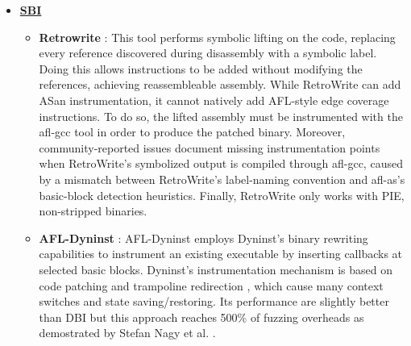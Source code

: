 \begin{itemize}
\begin{itemize}
                    \item \textbf{DynamoRIO/Pin}\cite{DynamoRIOPaper,PinPaper} : Both these approaches share the same base principle, called 
                    \textbf{\gls{JIT} code caching}. This consist on take control of the thread when the target application starts, 
                    and from that moment on every \gls{BB} is intercepted befor it is executed and is copied into a private \textbf{Code Cache}.
                    The instrumentation is then added to the copy and the control is transferred to the code cache.
                    The instrumentation process is more or less identical to FRIDA's Stalker mechanism, but are not optimized like taht.
                    Also in this case the implemented version uses AFL\cite{zalewski2017afl} as fuzzer \cite{heuse2018afldynamorio,heuse2018aflpin}.
            \end{itemize}
                \item \underline{\textbf{\gls{SBI}}}
                \begin{itemize}
                    \item \textbf{Retrowrite} \cite{retrowrite}: This tool performs symbolic lifting on the code, replacing every reference
                        discovered during disassembly with a symbolic label. Doing this allows instructions to be added without
                        modifying the references, achieving reassembleable assembly.
                        While RetroWrite can add ASan instrumentation, it cannot natively add AFL-style edge coverage instructions.
                        To do so, the lifted assembly must be instrumented with the afl-gcc tool in order to produce the patched binary.
                        Moreover, community-reported issues \cite{retrowrite_issue28} document missing instrumentation points when
                        RetroWrite's symbolized output is compiled through afl-gcc, caused by a mismatch between RetroWrite's
                        label-naming convention and afl-as's basic-block detection heuristics.
                        Finally, RetroWrite only works with PIE, non-stripped binaries.
                    \item \textbf{AFL-Dyninst} \cite{afldyninst} : AFL-Dyninst employs Dyninst's binary rewriting capabilities 
                            to instrument an existing executable by inserting callbacks at selected basic blocks. 
                            Dyninst's instrumentation mechanism is based on code patching and trampoline redirection \cite{Dyninst}, 
                            which cause many context switches and state saving/restoring.
                            Its performance are slightly better than \gls{DBI} but this approach reaches 500\% of fuzzing overheads 
                            as demostrated by Stefan Nagy et al. \cite{zafl}.
                 

\end{itemize}
\end{itemize}
